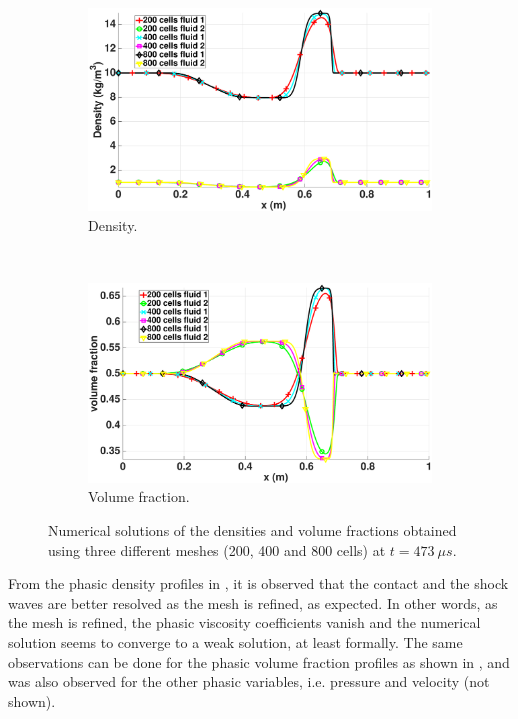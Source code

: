 \begin{figure}[H]
        \centering
        \begin{subfigure}[b]{0.95\textwidth}
                \centering
                \includegraphics[width=\textwidth]{figures/relaxation_two_phases_density_multiple_meshes.eps}
                \caption{Density.}
                \label{fig:density-mult-meshes}
        \end{subfigure}
				\\
        \begin{subfigure}[b]{0.95\textwidth}
                \centering
                \includegraphics[width=\textwidth]{figures/relaxation_two_phases_vf_multiple_meshes.eps}
                \caption{Volume fraction.}
                \label{fig:vf-mult-meshes}
        \end{subfigure}
        \caption{Numerical solutions of the densities and volume fractions obtained using three different meshes (200, 400 and 800 cells) at $t=473 \ \mu s$.}\label{fig:density-vf-mult-mesh}
\end{figure}
%
From the phasic density profiles in , it is observed that the contact and the shock waves are better resolved as the mesh is refined, as expected. In other words, 
as the mesh is refined, the phasic viscosity coefficients vanish and the numerical solution seems to converge to a weak solution, at least formally. The same observations can be done for
the phasic volume fraction profiles as shown in , and was also observed for the other phasic variables, i.e. pressure and velocity (not shown).

